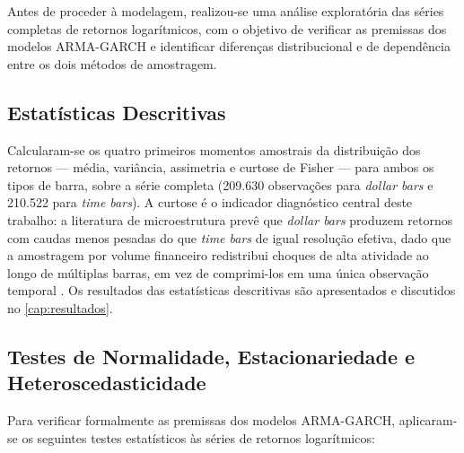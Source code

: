 Antes de proceder à modelagem, realizou-se uma análise exploratória das
séries completas de retornos logarítmicos, com o objetivo de verificar as
premissas dos modelos ARMA-GARCH e identificar diferenças distribucional
e de dependência entre os dois métodos de amostragem.

\subsection{Estatísticas Descritivas}
\label{subsec:met_descritivas}

Calcularam-se os quatro primeiros momentos amostrais da distribuição dos
retornos --- média, variância, assimetria e curtose de Fisher --- para
ambos os tipos de barra, sobre a série completa (209.630 observações para
\emph{dollar bars} e 210.522 para \emph{time bars}). A curtose é o
indicador diagnóstico central deste trabalho: a literatura de
microestrutura prevê que \emph{dollar bars} produzem retornos com caudas
menos pesadas do que \emph{time bars} de igual resolução efetiva, dado
que a amostragem por volume financeiro redistribui choques de alta
atividade ao longo de múltiplas barras, em vez de comprimi-los em uma
única observação temporal \cite{lopez2018advances}. Os resultados das
estatísticas descritivas são apresentados e discutidos no
\autoref{cap:resultados}.

\subsection{Testes de Normalidade, Estacionariedade e Heteroscedasticidade}
\label{subsec:met_testes}

Para verificar formalmente as premissas dos modelos ARMA-GARCH,
aplicaram-se os seguintes testes estatísticos às séries de retornos
logarítmicos:

